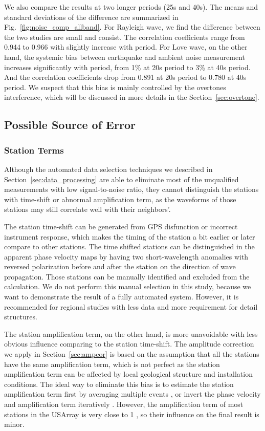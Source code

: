 \documentclass[referee]{gji}
\begin{document}
We also compare the results at two longer periods (25s and 40s). The means and standard deviations of the difference are summarized in Fig.~\ref{fig:noise_comp_allband}. For Rayleigh wave, we find the difference between the two studies are small and consist. The correlation coefficients range from 0.944 to 0.966 with slightly increase with period. For Love wave, on the other hand, the systemic bias between earthquake and ambient noise measurement increases significantly with period, from 1\% at 20s period to 3\% at 40s period. And the correlation coefficients drop from 0.891 at 20s period to 0.780 at 40s period. We suspect that this bias is mainly controlled by the overtones interference, which will be discussed in more details in the Section~\ref{sec:overtone}.

\subsection{Possible Source of Error}

\subsubsection{Station Terms}

Although the automated data selection techniques we described in Section~\ref{sec:data_processing} are able to eliminate most of the unqualified measurements with low signal-to-noise ratio, they cannot distinguish the stations with time-shift or abnormal amplification term, as the waveforms of those stations may still correlate well with their neighbors’. 

The station time-shift can be generated from GPS disfunction or incorrect instrument response, which makes the timing of the station a bit earlier or later compare to other stations. The time shifted stations can be distinguished in the apparent phase velocity maps by having two short-wavelength anomalies with reversed polarization before and after the station on the direction of wave propagation. Those stations can be manually identified and excluded from the calculation. We do not perform this manual selection in this study, because we want to demonstrate the result of a fully automated system. However, it is recommended for regional studies with less data and more requirement for detail structures.

The station amplification term, on the other hand, is more unavoidable with less obvious influence comparing to the station time-shift.  The amplitude correction we apply in Section~\ref{sec:ampcor} is based on the assumption that all the stations have the same amplification term, which is not perfect as the station amplification term can be affected by local geological structure and installation conditions. The ideal way to eliminate this bias is to estimate the station amplification term first by averaging multiple events \cite{Eddy:2013la}, or invert the phase velocity and amplification term iteratively \cite{Lin:2012la}. However, the amplification term of most stations in the USArray is very close to 1 \cite{Eddy:2013la}, so their influence on the final result is minor.
\end{document}
